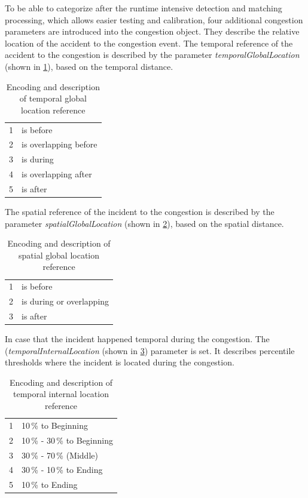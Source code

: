 To be able to categorize after the runtime intensive detection and matching processing, which allows easier testing and calibration, four additional congestion parameters are introduced into the congestion object. They describe the relative location of the accident to the congestion event. The temporal reference of the accident to the congestion is described by the parameter \textit{temporalGlobalLocation} (shown in \cref{tbl:jam_classification_GLT}), based on the temporal distance.
\begin{table}[ht!]
	\centering
	\begin{tabular}{c|l}  
		1 & is before \\ 
 		2 & is overlapping before \\ 
 		3 & is during \\
 		4 & is overlapping after \\
 		5 & is after \\
	\end{tabular}
	\caption{Encoding and description of temporal global location reference}
	\label{tbl:jam_classification_GLT}
	\vspace{-4mm}
\end{table}
The spatial reference of the incident to the congestion is described by the parameter \textit{spatialGlobalLocation} (shown in \cref{tbl:jam_classification_GLS}), based on the spatial distance.
\begin{table}[ht!]
	\centering
	\begin{tabular}{c|l}  
		1 & is before \\ 
 		2 & is during or overlapping \\ 
 		3 & is after \\ 
	\end{tabular}
	\caption{Encoding and description of spatial global location reference}
	\label{tbl:jam_classification_GLS}
	\vspace{-4mm}
\end{table}
In case that the incident happened temporal during the congestion. The (\textit{temporalInternalLocation} (shown in \cref{tbl:jam_classification_ILT}) parameter is set. It describes percentile thresholds where the incident is located during the congestion.
\begin{table}[ht!]
	\centering
	\begin{tabular}{c|l}  
		1 & 10\,\% to Beginning \\
 		2 & 10\,\% - 30\,\% to Beginning \\
 		3 & 30\,\% - 70\,\% (Middle) \\
 		4 & 30\,\% - 10\,\% to Ending \\
 		5 & 10\,\% to Ending \\
	\end{tabular}
	\caption{Encoding and description of temporal internal location reference}
	\label{tbl:jam_classification_ILT}
	\vspace{-4mm}
\end{table}
